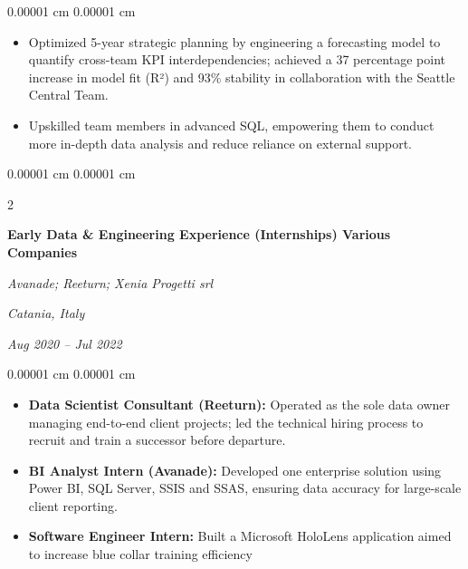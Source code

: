 \documentclass[10pt, letterpaper]{article}
\newenvironment{highlights}{
    \begin{itemize}[
        topsep=0.05 cm,
        parsep=0.05 cm,
        partopsep=0pt,
        itemsep=0pt,
        leftmargin=0.4 cm + 10pt
    ]
}{
    \end{itemize}
} %
\newenvironment{onecolentry}{
    \begin{adjustwidth}{
         0.00001 cm
    }{
        0.00001 cm
    }
}{
    \end{adjustwidth}
} %
\newenvironment{twocolentry}[2][]{
    \onecolentry
    \def\secondColumn{#2}
    \setcolumnwidth{\fill, 4.5 cm}
    \begin{paracol}{2}
}{
    \switchcolumn \raggedleft \secondColumn
    \end{paracol}
    \endonecolentry
} %
\begin{document}
        \vspace{0.15 cm}
        \begin{onecolentry}
            \begin{highlights}
            \item Optimized 5-year strategic planning by engineering a forecasting model to quantify cross-team KPI interdependencies; achieved a 37 percentage point increase in model fit (R²) and 93\% stability in collaboration with the Seattle Central Team.
    
            \item Upskilled team members in advanced SQL, empowering them to conduct more in-depth data analysis and reduce reliance on external support.

            \end{highlights}
        \end{onecolentry}
        \vspace{0.3 cm}
        \begin{twocolentry}{
        \textit{Catania, Italy}\vspace{0 cm}    
            
        \textit{Aug 2020 – Jul 2022}}
            \textbf{Early Data \& Engineering Experience (Internships) Various Companies}\vspace{0 cm}
            
            \textit{Avanade; Reeturn; Xenia Progetti srl}
        \end{twocolentry}

        \vspace{0.15 cm}
        \begin{onecolentry}
            \begin{highlights}
            \item \textbf{Data Scientist Consultant (Reeturn):} Operated as the sole data owner managing end-to-end client projects; led the technical hiring process to recruit and train a successor before departure.
    
            \item \textbf{BI Analyst Intern (Avanade):} Developed one enterprise solution using Power BI, SQL Server, SSIS and SSAS, ensuring data accuracy for large-scale client reporting.

            \item \textbf{Software Engineer Intern:} Built a Microsoft HoloLens application aimed to increase blue collar training efficiency

            \end{highlights}
        \end{onecolentry}
\end{document}

